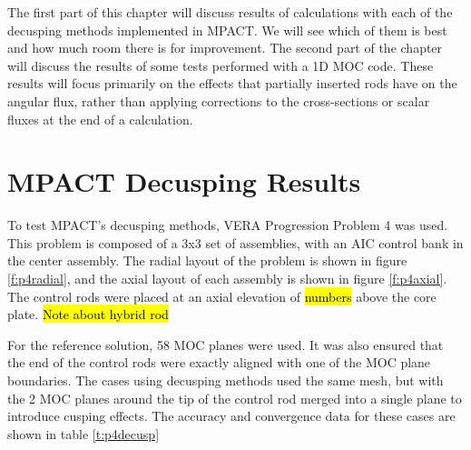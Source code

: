The first part of this chapter will discuss results of calculations with each of the decusping methods implemented in MPACT.  We will see which of them is best and how much room there is for improvement.  The second part of the chapter will discuss the results of some tests performed with a 1D MOC code.  These results will focus primarily on the effects that partially inserted rods have on the angular flux, rather than applying corrections to the cross-sections or scalar fluxes at the end of a calculation.

\section{MPACT Decusping Results}

To test MPACT's decusping methods, VERA Progression Problem 4  was used.  This problem is composed of a 3x3 set of assemblies, with an AIC control bank in the center assembly.  The radial layout of the problem is shown in figure \ref{f:p4radial}, and the axial layout of each assembly is shown in figure \ref{f:p4axial}.  The control rods were placed at an axial elevation of \hl{numbers} above the core plate. \hl{Note about hybrid rod}

For the reference solution, 58 MOC planes were used.  It was also ensured that the end of the control rods were exactly aligned with one of the MOC plane boundaries.  The cases using decusping methods used the same mesh, but with the 2 MOC planes around the tip of the control rod merged into a single plane to introduce cusping effects.  The accuracy and convergence data for these cases are shown in table \ref{t:p4decusp}

